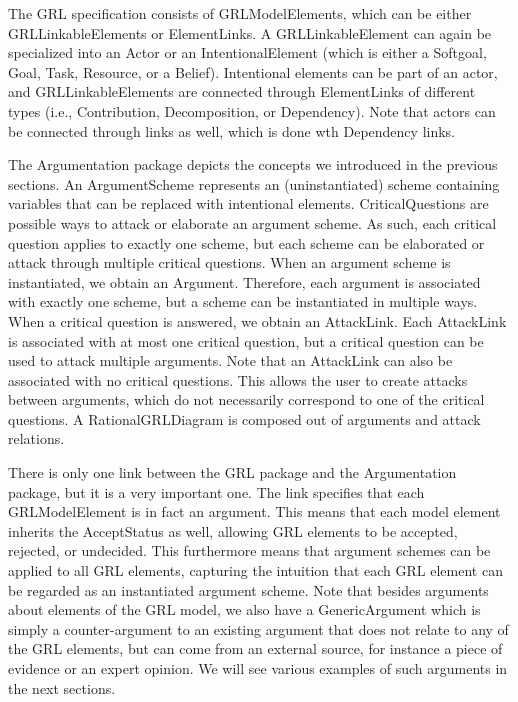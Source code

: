 The GRL specification consists of \textsf{GRLModelElements}, which can be either \textsf{GRLLinkableElements} or \textsf{ElementLinks}. A \textsf{GRLLinkableElement} can again be specialized into an \textsf{Actor} or an \textsf{IntentionalElement} (which is either a \textsf{Softgoal}, \textsf{Goal}, \textsf{Task}, \textsf{Resource}, or a \textsf{Belief}). Intentional elements can be part of an actor, and \textsf{GRLLinkableElements} are connected through \textsf{ElementLinks} of different types (i.e., \textsf{Contribution, Decomposition}, or \textsf{Dependency}). Note that actors can be connected through links as well, which is done wth \textsf{Dependency} links. 

The Argumentation package depicts the concepts we introduced in the previous sections. An \textsf{ArgumentScheme} represents an (uninstantiated) scheme containing variables that can be replaced with intentional elements. \textsf{CriticalQuestions} are possible ways to attack or elaborate an argument scheme. As such, each critical question applies to exactly one scheme, but each scheme can be elaborated or attack through multiple critical questions. When an argument scheme is instantiated, we obtain an \textsf{Argument}. Therefore, each argument is associated with exactly one scheme, but a scheme can be instantiated in multiple ways. When a critical question is answered, we obtain an \textsf{AttackLink}. Each \textsf{AttackLink} is associated with at most one critical question, but a critical question can be used to attack multiple arguments.  Note that an \textsf{AttackLink} can also be associated with no critical questions. This allows the user to create attacks between arguments, which do not necessarily correspond to one of the critical questions. A \textsf{RationalGRLDiagram} is composed out of arguments and attack relations.

There is only one link between the \textsf{GRL} package and the \textsf{Argumentation} package, but it is a very important one. The link specifies that each \textsf{GRLModelElement} is in fact an argument. This means that each model element inherits the \textsf{AcceptStatus} as well, allowing GRL elements to be accepted, rejected, or undecided. This furthermore means that argument schemes can be applied to all GRL elements, capturing the intuition that each GRL element can be regarded as an instantiated argument scheme. Note that besides arguments about elements of the GRL model, we also have a \textsf{GenericArgument} which is simply a counter-argument to an existing argument that does not relate to any of the GRL elements, but can come from an external source, for instance a piece of evidence or an expert opinion. We will see various examples of such arguments in the next sections.

